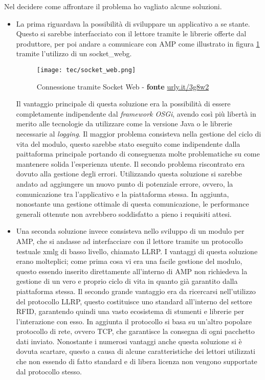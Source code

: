 Nel decidere come affrontare il problema ho vagliato alcune soluzioni.
\begin{itemize}
    \item La prima riguardava la possibilità di sviluppare un applicativo a se stante. Questo si sarebbe interfacciato 
    con il lettore tramite le librerie offerte dal produttore, per poi andare a comunicare con AMP come illustrato in figura \ref{socket_web} tramite l'utilizzo di un \gls{socket_webg}.

    \begin{figure}[!h] 
        \centering 
        \texttt{[image: tec/socket\_web.png]} 
        \caption{Connessione tramite Socket Web - \textbf{fonte} \url{urly.it/3g8w2}}
        \label{socket_web}
    \end{figure}

    Il vantaggio principale di questa soluzione era la possibilità di essere completamente indipendente dal \emph{framework OSGi}, avendo così più 
    libertà in merito alle tecnologie da utilizzare come la versione Java o le librerie necessarie al \emph{logging}.
    Il maggior problema consisteva nella gestione del ciclo di vita del modulo, questo sarebbe stato eseguito come indipendente dalla paittaforma principale
    portando di conseguenza molte problematiche su come mantenere solida l'esperienza utente.
    Il secondo problema riscontrato era dovuto alla gestione degli errori. Utilizzando questa soluzione si sarebbe andato ad aggiungere un nuovo punto
    di potenziale errore, ovvero, la comunicazione tra l'applicativo e la piattaforma stessa. In aggiunta, nonostante una gestione ottimale di questa comunicazione,
    le performance generali ottenute non avrebbero soddisfatto a pieno i requisiti attesi.
    
    \item Una seconda soluzione invece consisteva nello sviluppo di un modulo per AMP, che si andasse ad interfacciare con il lettore tramite un protocollo
    testuale \gls{xmlg} di basso livello, chiamato LLRP. 
    I vantaggi di questa soluzione erano molteplici; come prima cosa vi era una facile gestione del modulo,
    questo essendo inserito direttamente all'interno di AMP non richiedeva la gestione di un vero e proprio ciclo di vita in quanto già garantito dalla
    piattaforma stessa. Il secondo grande vantaggio era da ricercarsi nell'utilizzo del protocollo LLRP, questo costituisce uno standard all'interno del
    settore RFID, garantendo quindi una vasto ecosistema di stumenti e librerie per l'interazione con esso. In aggiunta il protocollo si basa su un'altro 
    popolare protocollo di rete, ovvero TCP, che garantisce la consegna di ogni pacchetto dati inviato.
    Nonostante i numerosi vantaggi anche questa soluzione si è dovuta scartare, questo a causa di alcune caratteristiche dei lettori utilizzati che non
    essendo di fatto standard e di libera licenza non vengono supportate dal protocollo stesso.
\end{itemize}

